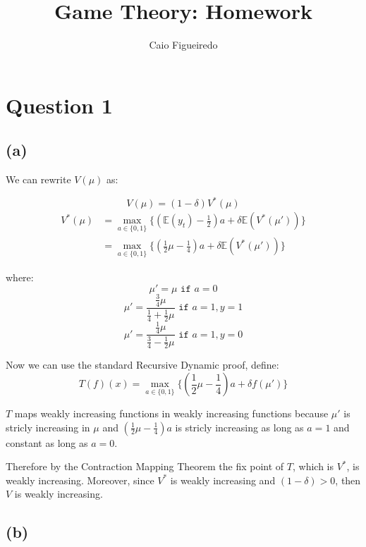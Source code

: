 \documentclass{article}
\title{Game Theory: Homework} %
\author{Caio Figueiredo} %
\begin{document}
\maketitle %


\section{Question 1}
\subsection{(a)} %

We can rewrite $V(\mu)$ as:

\[ 
  V(\mu) = (1 - \delta)V^*(\mu) 
\]
\begin{equation}
  \begin{split}
    V^*(\mu) & = \max_{a \in \{0, 1\}}\{(\mathbb{E}(y_t) - \frac{1}{2})a + \delta \mathbb{E}(V^*(\mu'))\} \\
             & = \max_{a \in \{0, 1\}}\{(\frac{1}{2}\mu  - \frac{1}{4})a + \delta \mathbb{E}(V^*(\mu'))\}
  \end{split}
\end{equation}

where:
\[
  \mu' =  \mu \texttt{ if } a = 0
\]
\[
  \mu' = \frac{\frac{3}{4}\mu}{\frac{1}{4} + \frac{1}{2}\mu} \texttt{ if } a = 1, y = 1
\]
\[
  \mu' = \frac{\frac{1}{4}\mu}{\frac{3}{4} - \frac{1}{2}\mu} \texttt{ if } a = 1, y = 0
\]

Now we can use the standard Recursive Dynamic proof, define:
\[
  T(f)(x) = \max_{a \in \{0, 1\}}\{(\frac{1}{2}\mu  - \frac{1}{4})a + \delta f(\mu') \}
\]

$T$ maps weakly increasing functions in weakly increasing functions because $\mu'$
is stricly increasing in $\mu$ and $(\frac{1}{2}\mu  - \frac{1}{4})a$ is stricly
increasing as long as $a = 1$ and constant as long as $a = 0$.

Therefore by the Contraction Mapping Theorem the fix point of $T$, which is $V^*$,
is weakly increasing. Moreover, since $V^*$ is weakly increasing and $(1 - \delta) > 0$,
then $V$ is weakly increasing.

\subsection{(b)} %
\end{document}
